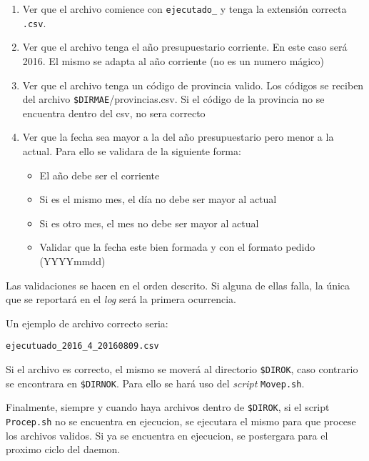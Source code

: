\documentclass[10pt,a4paper]{article}
\begin{document}
\begin{enumerate}
    \item Ver que el archivo comience con \texttt{ejecutado\_} y tenga la extensión correcta \texttt{.csv}.
    
    \item Ver que el archivo tenga el año presupuestario corriente. En este caso será 2016. El mismo se adapta al año corriente (no es un numero mágico)
    
    \item Ver que el archivo tenga un código de provincia valido. Los códigos se reciben del archivo \texttt{\$DIRMAE}/provincias.csv. Si el código de la provincia no se encuentra dentro del csv, no sera correcto
    
    \item Ver que la fecha sea mayor a la del año presupuestario pero menor a la actual. Para ello se validara de la siguiente forma:
    
    \begin{itemize}
        \item El año debe ser el corriente
        
        \item Si es el mismo mes, el día no debe ser mayor al actual
        
        \item Si es otro mes, el mes no debe ser mayor al actual
        
        \item Validar que la fecha este bien formada y con el formato pedido (YYYYmmdd)
    \end{itemize}
    
\end{enumerate}

Las validaciones se hacen en el orden descrito. Si alguna de ellas falla, la única que se reportará en el \textit{log} será la primera ocurrencia. 

Un ejemplo de archivo correcto seria:

\texttt{ejecutuado\_2016\_4\_20160809.csv}

Si el archivo es correcto, el mismo se moverá al directorio \texttt{\$DIROK}, caso contrario se encontrara en \texttt{\$DIRNOK}. Para ello se hará uso del \textit{script} \texttt{Movep.sh}.

Finalmente, siempre y cuando haya archivos dentro de \texttt{\$DIROK}, si el script \texttt{Procep.sh} no se encuentra en ejecucion, se ejecutara el mismo para que procese los archivos validos. Si ya se encuentra en ejecucion, se postergara para el proximo ciclo del daemon.
\end{document}
